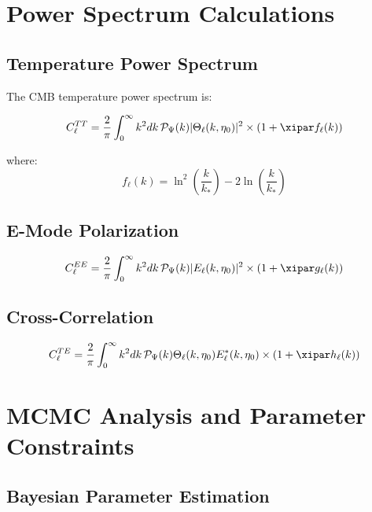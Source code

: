 	\section{Power Spectrum Calculations}
	\label{sec:power_spectra}
	
	\subsection{Temperature Power Spectrum}
	
	The CMB temperature power spectrum is:
	
	\begin{equation}
		C_\ell^{TT} = \frac{2}{\pi}\int_0^\infty k^2 dk \, \mathcal{P}_\Psi(k) |\Theta_\ell(k,\eta_0)|^2 \times \left(1 + \xipar f_\ell(k)\right)
		\label{eq:cl_tt}
	\end{equation}
	
	where:
	\begin{equation}
		f_\ell(k) = \ln^2\left(\frac{k}{k_*}\right) - 2\ln\left(\frac{k}{k_*}\right)
	\end{equation}
	
	\subsection{E-Mode Polarization}
	
	\begin{equation}
		C_\ell^{EE} = \frac{2}{\pi}\int_0^\infty k^2 dk \, \mathcal{P}_\Psi(k) |E_\ell(k,\eta_0)|^2 \times \left(1 + \xipar g_\ell(k)\right)
	\end{equation}
	
	\subsection{Cross-Correlation}
	
	\begin{equation}
		C_\ell^{TE} = \frac{2}{\pi}\int_0^\infty k^2 dk \, \mathcal{P}_\Psi(k) \Theta_\ell(k,\eta_0) E_\ell^*(k,\eta_0) \times \left(1 + \xipar h_\ell(k)\right)
	\end{equation}
	
	\section{MCMC Analysis and Parameter Constraints}
	\label{sec:mcmc}
	
	\subsection{Bayesian Parameter Estimation}
	
